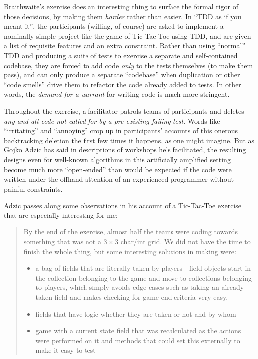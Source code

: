 Braithwaite's exercise does an interesting thing to surface the formal rigor of those decisions, by making them \emph{harder} rather than easier. In ``TDD as if you meant it'', the participants (willing, of course) are asked to implement a nominally simple project like the game of Tic-Tac-Toe using TDD, and are given a list of requisite features and an extra constraint. Rather than using ``normal'' TDD and producing a suite of tests to exercise a separate and self-contained codebase, they are forced to add code \emph{only} to the tests themselves (to make them pass), and can only produce a separate ``codebase'' when duplication or other ``code smells'' drive them to refactor the code already added to tests. In other words, the \emph{demand for a warrant} for writing code is much more stringent.

Throughout the exercise, a facilitator patrols teams of participants and deletes \emph{any and all code not called for by a pre-existing failing test}. Words like ``irritating'' and ``annoying'' crop up in participants' accounts of  this onerous backtracking deletion the first few times it happens, as one might imagine. But as Gojko Adzic \citep{Adzic2009} has said in descriptions of workshops he's facilitated, the resulting designs even for well-known algorithms in this artificially amplified setting become much more ``open-ended'' than would be expected if the code were written under the offhand attention of an experienced programmer without painful constraints.

Adzic passes along some observations in his account  of a Tic-Tac-Toe exercise \citep{Adzic2009} that are especially interesting for me:

\begin{quotation}
By the end of the exercise, almost half the teams were coding towards something that was not a $3\times 3$ char/int grid. We did not have the time to finish the whole thing, but some interesting solutions in making were:

\begin{itemize}
\item a bag of fields that are literally taken by players---field objects start in the collection belonging to the game and move to collections belonging to players, which simply avoids edge cases such as taking an already taken field and makes checking for game end criteria very easy.
\item fields that have logic whether they are taken or not and by whom
\item game with a current state field that was recalculated as the actions were performed on it and methods that could set this externally to make it easy to test
\end{itemize}
\end{quotation}

